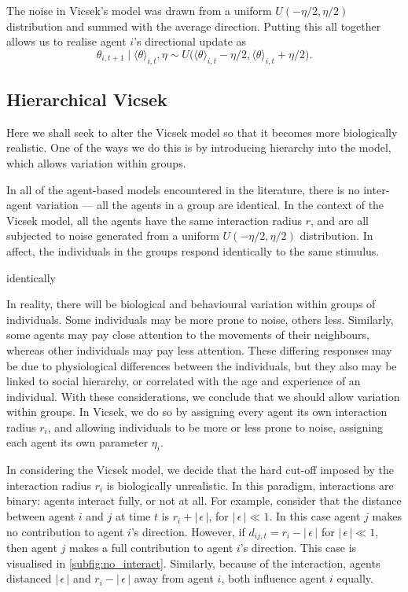The noise in Vicsek's model was drawn from a uniform $U(-\eta/2, \eta/2)$ distribution and summed 
with the average direction. Putting this all together allows us to realise agent $i$'s directional 
update as
\begin{equation}
\label{eq:vicsek_update}
	\theta_{i,t+1} \mid \langle \theta \rangle_{i, t}, \eta \sim U\big(\langle \theta \rangle_{i, t} 
-\eta/2, \langle \theta \rangle_{i, t} + \eta/2\big).
\end{equation}

\subsection{Hierarchical Vicsek}
\label{ssec:general_vicsek}

Here we shall seek to alter the Vicsek model so that it becomes more biologically realistic. One of 
the ways we do this is by introducing hierarchy into the model, which allows variation within groups. 


In all of the agent-based models encountered in the literature, there is no inter-agent variation --- 
all the agents in a group are identical. In the context of the Vicsek model, all the agents have the 
same interaction radius $r$, and are all subjected to noise generated from a uniform $U(-\eta/2, 
\eta/2)$ distribution. In affect, the individuals in the groups respond identically to the same 
stimulus.

identically

In reality, there will be biological and behavioural variation within groups of individuals. Some 
individuals may be more prone to noise, others less. Similarly, some agents may pay close attention 
to the movements of their neighbours, whereas other individuals may pay less attention. These 
differing responses may be due to physiological differences between the individuals, but they also 
may be linked to social hierarchy, or correlated with the age and experience of an individual. With 
these considerations, we conclude that we should allow variation within groups. In Vicsek, we do so 
by assigning every agent its own interaction radius $r_i$, and allowing individuals to be more or 
less prone to noise, assigning each agent its own parameter $\eta_i$.

In considering the Vicsek model, we decide that the hard cut-off imposed by the interaction radius 
$r_i$ is biologically unrealistic. In this paradigm, interactions are binary: agents interact fully, 
or not at all. For example, consider that the distance between agent $i$ and $j$ at time $t$ is  $r_i 
+ |\, \epsilon \,|$, for $|\, \epsilon \, | \ll 1$. In this case agent $j$ makes no contribution to 
agent $i$'s direction. However, if $d_{ij, t} = r_i - |\, \epsilon\,| $ for $|\, \epsilon \,| \ll 1$, 
then agent $j$ makes a full contribution to agent $i$'s direction. This case is visualised in 
\cref{subfig:no_interact}. Similarly, because of the interaction, agents distanced $|\,\epsilon\,|$ 
and $r_i - |\,\epsilon\,|$ away from agent $i$, both influence agent $i$ equally.

